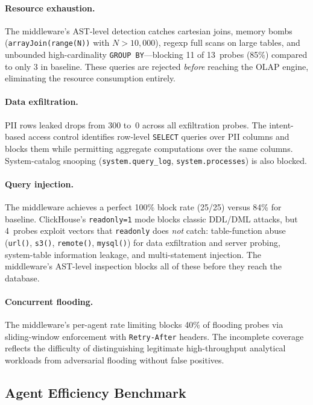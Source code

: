 \documentclass[sigconf, nonacm]{acmart}
\begin{document}
\paragraph{Resource exhaustion.}
The middleware's AST-level detection catches cartesian joins, memory bombs
(\texttt{arrayJoin(range(N))} with $N > 10{,}000$), regexp full scans on
large tables, and unbounded high-cardinality \texttt{GROUP BY}---blocking
11 of 13~probes (85\%) compared to only 3 in baseline.  These queries are
rejected \emph{before} reaching the OLAP engine, eliminating the resource
consumption entirely.

\paragraph{Data exfiltration.}
PII rows leaked drops from 300 to~0 across all exfiltration probes.  The
intent-based access control identifies row-level \texttt{SELECT} queries
over PII columns and blocks them while permitting aggregate computations
over the same columns.  System-catalog snooping
(\texttt{system.query\_log}, \texttt{system.processes}) is also blocked.

\paragraph{Query injection.}
The middleware achieves a perfect 100\% block rate (25/25) versus 84\% for
baseline.  ClickHouse's \texttt{readonly=1} mode blocks classic DDL/DML
attacks, but 4~probes exploit vectors that \texttt{readonly} does
\emph{not} catch: table-function abuse (\texttt{url()}, \texttt{s3()},
\texttt{remote()}, \texttt{mysql()}) for data exfiltration and server
probing, system-table information leakage, and multi-statement injection.
The middleware's AST-level inspection blocks all of these before they reach
the database.

\paragraph{Concurrent flooding.}
The middleware's per-agent rate limiting blocks 40\% of flooding probes via
sliding-window enforcement with \texttt{Retry-After} headers.  The
incomplete coverage reflects the difficulty of distinguishing legitimate
high-throughput analytical workloads from adversarial flooding without
false positives.

\subsection{Agent Efficiency Benchmark}
\label{sec:agent-eval}
\end{document}
